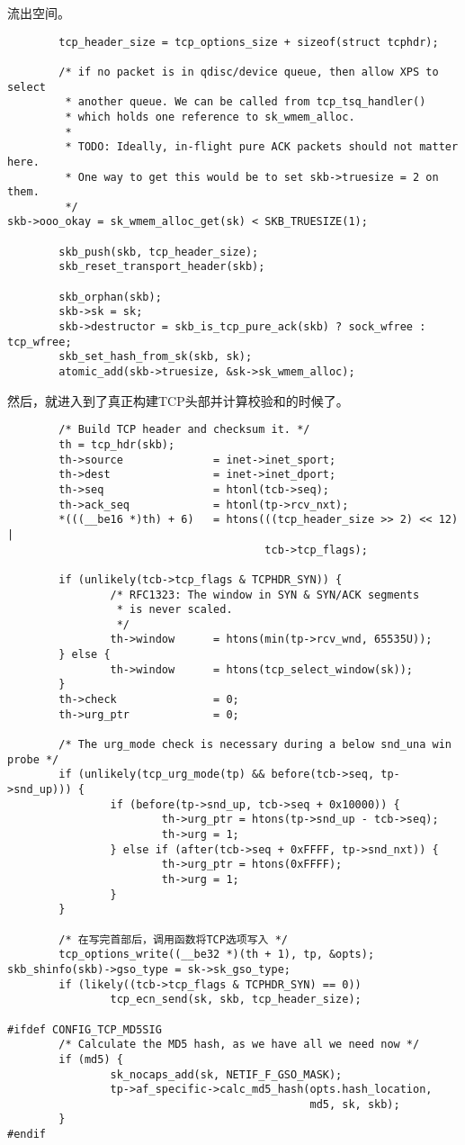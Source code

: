 流出空间。
\begin{verbatim}
        tcp_header_size = tcp_options_size + sizeof(struct tcphdr);

        /* if no packet is in qdisc/device queue, then allow XPS to select
         * another queue. We can be called from tcp_tsq_handler()
         * which holds one reference to sk_wmem_alloc.
         *
         * TODO: Ideally, in-flight pure ACK packets should not matter here.
         * One way to get this would be to set skb->truesize = 2 on them.
         */
skb->ooo_okay = sk_wmem_alloc_get(sk) < SKB_TRUESIZE(1);

        skb_push(skb, tcp_header_size);
        skb_reset_transport_header(skb);

        skb_orphan(skb);
        skb->sk = sk;
        skb->destructor = skb_is_tcp_pure_ack(skb) ? sock_wfree : tcp_wfree;
        skb_set_hash_from_sk(skb, sk);
        atomic_add(skb->truesize, &sk->sk_wmem_alloc);
\end{verbatim}
然后，就进入到了真正构建TCP头部并计算校验和的时候了。
\begin{verbatim}
        /* Build TCP header and checksum it. */
        th = tcp_hdr(skb);
        th->source              = inet->inet_sport;
        th->dest                = inet->inet_dport;
        th->seq                 = htonl(tcb->seq);
        th->ack_seq             = htonl(tp->rcv_nxt);
        *(((__be16 *)th) + 6)   = htons(((tcp_header_size >> 2) << 12) |
                                        tcb->tcp_flags);

        if (unlikely(tcb->tcp_flags & TCPHDR_SYN)) {
                /* RFC1323: The window in SYN & SYN/ACK segments
                 * is never scaled.
                 */
                th->window      = htons(min(tp->rcv_wnd, 65535U));
        } else {
                th->window      = htons(tcp_select_window(sk));
        }
        th->check               = 0;
        th->urg_ptr             = 0;

        /* The urg_mode check is necessary during a below snd_una win probe */
        if (unlikely(tcp_urg_mode(tp) && before(tcb->seq, tp->snd_up))) {
                if (before(tp->snd_up, tcb->seq + 0x10000)) {
                        th->urg_ptr = htons(tp->snd_up - tcb->seq);
                        th->urg = 1;
                } else if (after(tcb->seq + 0xFFFF, tp->snd_nxt)) {
                        th->urg_ptr = htons(0xFFFF);
                        th->urg = 1;
                }
        }

        /* 在写完首部后，调用函数将TCP选项写入 */
        tcp_options_write((__be32 *)(th + 1), tp, &opts);
skb_shinfo(skb)->gso_type = sk->sk_gso_type;
        if (likely((tcb->tcp_flags & TCPHDR_SYN) == 0))
                tcp_ecn_send(sk, skb, tcp_header_size);

#ifdef CONFIG_TCP_MD5SIG
        /* Calculate the MD5 hash, as we have all we need now */
        if (md5) {
                sk_nocaps_add(sk, NETIF_F_GSO_MASK);
                tp->af_specific->calc_md5_hash(opts.hash_location,
                                               md5, sk, skb);
        }
#endif
\end{verbatim}
